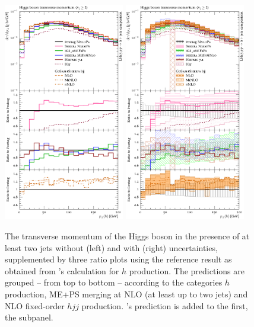\begin{figure}[t!]
  \centering
  \includegraphics[width=0.47\textwidth]{figures/hjetscomp_u_H_jj_pT_incl.pdf}
  \hfill
  \includegraphics[width=0.47\textwidth]{figures/hjetscomp_H_jj_pT_incl.pdf}
  \caption{\label{fig:hjetscomp:results:2obs:hpt}%
    The transverse momentum of the Higgs boson in the presence of at
    least two jets without (left) and with (right) uncertainties,
    supplemented by three ratio plots using the reference result as
    obtained from \Powheg's \NNLOPS calculation for $h$ production.
    The predictions are grouped -- from top to bottom -- according to
    the categories \NNLOPS $h$ production, ME+PS merging at NLO (at
    least up to two jets) and NLO fixed-order $hjj$ production. \Hej's
    prediction is added to the first, the \NNLOPS subpanel.}
\end{figure}

